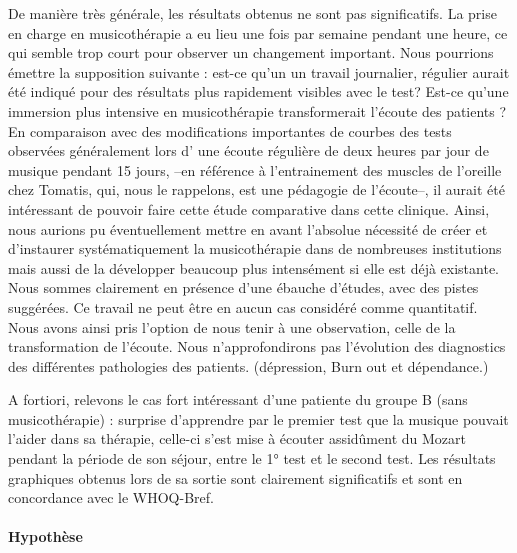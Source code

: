 \begin{enumerate}
  
  De manière très générale, les résultats obtenus ne
  sont pas significatifs.  La prise en charge en musicothérapie a eu lieu
  une fois par semaine pendant une heure, ce qui semble trop court pour observer un changement important. Nous pourrions émettre la supposition suivante :  est-ce qu'un un travail journalier, régulier aurait été indiqué pour des résultats plus rapidement visibles avec le test?
  Est-ce qu'une immersion plus intensive en musicothérapie transformerait l'écoute des patients ? 
   En comparaison avec des
  modifications importantes de courbes des tests observées généralement  lors d' une écoute
  régulière de deux heures par jour de musique pendant 15 jours, --en référence à l'entrainement des muscles de l'oreille chez Tomatis, qui, nous le rappelons, est une pédagogie de l'écoute--, il aurait été intéressant de pouvoir faire cette étude comparative dans cette clinique. Ainsi, nous aurions pu éventuellement mettre en avant  l'absolue nécessité de créer et d'instaurer systématiquement la musicothérapie dans de nombreuses institutions mais aussi  de la développer beaucoup plus intensément  si elle est déjà existante.
  Nous sommes clairement en présence d'une ébauche d'études, avec des pistes
  suggérées. Ce travail ne peut être en aucun cas considéré comme
  quantitatif.  Nous avons ainsi pris l'option de nous tenir à une
  observation, celle de la transformation de l'écoute. Nous n'approfondirons pas l'évolution des diagnostics des différentes
  pathologies des patients.  (dépression, Burn out et dépendance.)
  
  A fortiori, relevons le cas fort intéressant  d'une patiente du groupe B (sans
  musicothérapie) : 
surprise d'apprendre par le premier test que la musique pouvait l'aider
  dans sa thérapie, celle-ci s'est mise à écouter assidûment du Mozart pendant la période de son séjour, entre le 1° test et le second test.  Les résultats
  graphiques obtenus lors de sa sortie sont clairement significatifs
  et sont en concordance avec le WHOQ-Bref. 




   
   
   
   
  \end{enumerate}







\paragraph{Hypothèse}

